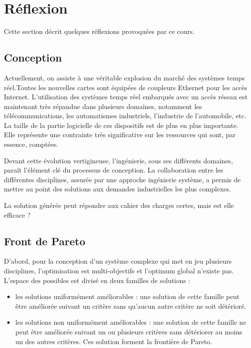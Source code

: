 \section{Réflexion}

Cette section décrit quelques réflexions provoquées par ce cours.

\subsection{Conception}

Actuellement, on assiste à une véritable explosion du marché des systèmes temps
réel.Toutes les nouvelles cartes sont équipées de coupleurs Ethernet pour les
accès Internet. L'utilisation des systèmes temps réel embarqués avec un accès
réseau est maintenant très répandue dans plusieurs domaines, notamment les
télécommunications, les automatismes industriels, l'industrie de l’automobile,
etc. La taille de la partie logicielle de ces dispositifs est de plus en plus
importante. Elle représente une contrainte très significative sur les ressources
qui sont, par essence, comptées.

Devant cette évolution vertigineuse, l'ingénierie, sous ses différents domaines,
paraît l'élément clé du processus de conception. La collaboration entre les
différentes disciplines, assurée par une approche ingénierie système, a permis
de mettre au point des solutions aux demandes industrielles les plus complexes.

La solution générée peut répondre aux cahier des charges certes, mais est elle
efficace ?

\subsection{Front de Pareto}

D'abord, pour la conception d'un système complexe qui met en jeu plusieurs
disciplines, l'optimisation est multi-objectifs et l'optimum global n'existe
pas. L'espace des possibles est divisé en deux familles de solutions :
\begin{itemize}
  \item les solutions uniformément améliorables : une solution de cette famille
    peut être améliorée suivant un critère sans qu'aucun autre critère ne soit
    détérioré.
  \item les solutions non uniformément améliorables : une solution de cette
    famille ne peut être améliorée suivant un ou plusieurs critères sans détériorer
    au moins un des autres critères. Ces solution forment la frontière de Pareto.
\end{itemize}

